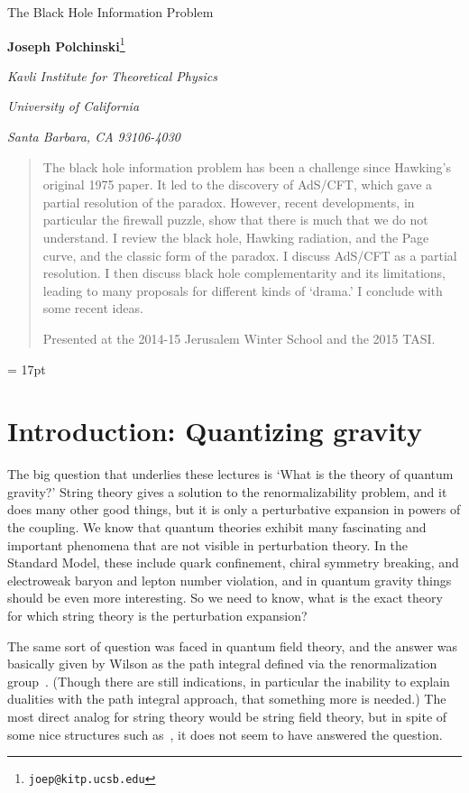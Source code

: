 \documentclass[12pt]{article}
\newcommand{\sect}[1]{\section{#1}\setcounter{equation}{0}}
\begin{document}

\begin{titlepage}
\bigskip
\bigskip\bigskip\bigskip
\centerline{\Large The Black Hole Information Problem}
\bigskip\bigskip\bigskip
\bigskip\bigskip\bigskip

 \centerline{ {\bf Joseph Polchinski}\footnote{\tt joep@kitp.ucsb.edu}}
\medskip
\centerline{\em Kavli Institute for Theoretical Physics}
\centerline{\em University of California}
\centerline{\em Santa Barbara, CA 93106-4030}\bigskip
\bigskip
\bigskip\bigskip



\begin{abstract}
The black hole information problem has been a challenge since Hawking's original 1975 paper.  It led to the discovery of AdS/CFT, which gave a partial resolution of the paradox.  However, recent developments, in particular the firewall puzzle, show that there is much that we do not understand.  I review the black hole, Hawking radiation, and the Page curve, and the classic form of the paradox.  I discuss AdS/CFT as a partial resolution.  I then discuss black hole complementarity and its limitations, leading to many proposals for different kinds of `drama.'  I conclude with some recent ideas.

Presented at the 2014-15 Jerusalem Winter School and the 2015 TASI.
\end{abstract}
\end{titlepage}
\baselineskip = 17pt
\setcounter{footnote}{0}

\tableofcontents

\sect{Introduction: Quantizing gravity}

The big question that underlies these lectures is `What is the theory of quantum gravity?'  String theory gives a solution to the renormalizability problem, and it does many other good things, but it is only a perturbative expansion in powers of the coupling.  We know that quantum theories exhibit many fascinating and important phenomena that are not visible in perturbation theory.  In the Standard Model, these include quark confinement, chiral symmetry breaking, and electroweak baryon and lepton number violation, and in quantum gravity things should be even more interesting.  So we need to know, what is the exact theory for which string theory is the perturbation expansion? 

The same sort of question was faced in quantum field theory, and the answer was basically given by Wilson as the path integral defined via the renormalization group~\cite{Wilson:1993dy}.   (Though there are still indications, in particular the inability to explain dualities with the path integral approach, that something more is needed.)  The most direct analog for string theory would be string field theory, but in spite of some nice structures such as~\cite{Witten:1985cc}, it does not seem to have answered the question.
\end{document}
